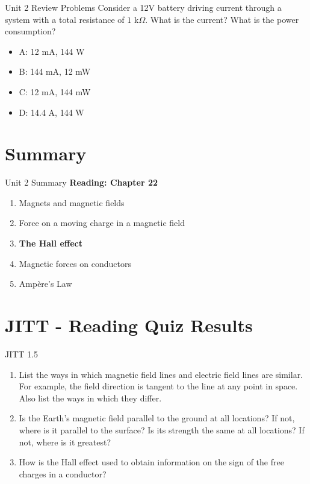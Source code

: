 \documentclass{beamer}
\begin{document}
\begin{frame}{Unit 2 Review Problems}
Consider a 12V battery driving current through a system with a total resistance of $1$ k$\Omega$.  What is the current?  What is the power consumption? 
\begin{itemize}
\item A: 12 mA, 144 W
\item B: 144 mA, 12 mW
\item C: 12 mA, 144 mW
\item D: 14.4 A, 144 W
\end{itemize}
\end{frame}

\section{Summary}

\begin{frame}{Unit 2 Summary}
\textbf{Reading: Chapter 22}
\begin{enumerate}
\item Magnets and magnetic fields
\item Force on a moving charge in a magnetic field
\item \textbf{The Hall effect}
\item Magnetic forces on conductors
\item \alert{Amp\`{e}re's Law}
\end{enumerate}
\end{frame}

\section{JITT - Reading Quiz Results}

\begin{frame}{JITT 1.5}
\begin{enumerate}
\item List the ways in which magnetic field lines and electric field lines are similar. For example, the field direction is tangent to the line at any point in space. Also list the ways in which they differ.
\item Is the Earth’s magnetic field parallel to the ground at all locations? If not, where is it parallel to the surface? Is its strength the same at all locations? If not, where is it greatest?
\item How is the Hall effect used to obtain information on the sign of the free charges in a conductor?
\end{enumerate}
\end{frame}
\end{document}
